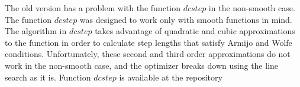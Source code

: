 





The old version has a problem with the function $dcstep$ in the non-smooth case. The function $dcstep$ was designed to work only with smooth functions in mind. The algorithm in $dcstep$ takes advantage of quadratic and cubic approximations to the function in order to calculate step lengths that satisfy Armijo and Wolfe conditions. Unfortunately, these second and third order approximations do not work in the non-smooth case, and the optimizer breaks down using the line search as it is. Function $dcstep$ is available at the repository \citep{lbfgsbNS}

